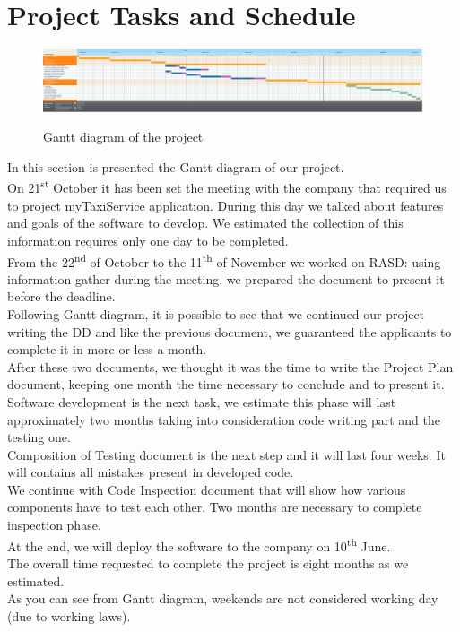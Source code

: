 \newpage
\section{Project Tasks and Schedule}
\begin{figure}[H]
\centering
\includegraphics[scale=0.17]{DiagramSources/Ganttingsoftware2.png}
\label{Figure 1: }\caption{Gantt diagram of the project}
\end{figure}
In this section is presented the Gantt diagram of our project.\\
On 21\textsuperscript{st} October it has been set the meeting with the company that required us to project myTaxiService application. During this day we talked about features and goals of the software to develop. We estimated the collection of this information requires only one day to be completed. \\
From the 22\textsuperscript{nd} of October to the 11\textsuperscript{th} of November we worked on RASD: using information gather during the meeting, we prepared the document to present it before the deadline. \\
Following Gantt diagram, it is possible to see that we continued our project writing the DD and like the previous document, we guaranteed the applicants to complete it in more or less a month. \\
After these two documents, we thought it was the time to write the Project Plan document, keeping one month the time necessary to conclude and to present it. \\
Software development is the next task, we estimate this phase will last approximately two months taking into consideration code writing part and the testing one. \\
Composition of Testing document is the next step and it will last four weeks. It will contains all mistakes present in developed code. \\
We continue with Code Inspection document that will show how various components have to test each other. Two months are necessary to complete inspection phase. \\
At the end, we will deploy the software to the company on 10\textsuperscript{th} June. \\
The overall time requested to complete the project is eight months as we estimated. \\
As you can see from Gantt diagram, weekends are not considered working day (due to working laws).\\
       